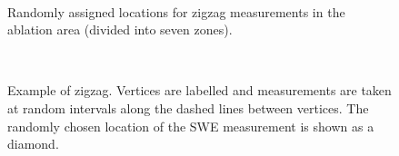 \documentclass{sfuthesis}
\begin{document}
\begin{landscape}
\begin{figure}
	\centering
	\\
	\caption{Randomly assigned locations for zigzag measurements in the ablation area (divided into seven zones).}
	\label{zigzag_planned}
\end{figure}
\end{landscape}

\begin{figure}
	\centering
	\\
	\caption{Example of zigzag. Vertices are labelled and measurements are taken at random intervals along the dashed lines between vertices. The randomly chosen location of the SWE measurement is shown as a diamond.}
	\label{zigzag_vertex}
\end{figure}
\end{document}
